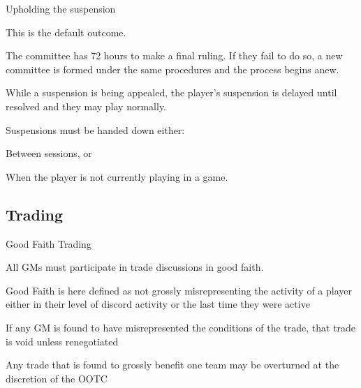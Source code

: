 \begin{deepEnumerate}
\begin{deepEnumerate}
\begin{deepEnumerate}
\begin{deepEnumerate}
			\end{deepEnumerate}
			\item Upholding the suspension
			\begin{deepEnumerate}
				\item This is the default outcome.
			\end{deepEnumerate}
		\end{deepEnumerate}
		\item The committee has 72 hours to make a final ruling.
		If they fail to do so,
		a new committee is formed under the same procedures and the process begins anew.
		\item While a suspension is being appealed,
		the player's suspension is delayed until resolved
		and they may play normally.
	\end{deepEnumerate}
	\item Suspensions must be handed down either:
	\begin{deepEnumerate}
		\item Between sessions, or
		\item When the player is not currently playing in a game.
	\end{deepEnumerate}
\end{deepEnumerate}

\subsection{Trading}
\begin{deepEnumerate}
	\item Good Faith Trading
	\begin{deepEnumerate}
		\item All GMs must participate in trade discussions in good faith.
			\begin{deepEnumerate}
			\item Good Faith is here defined as not grossly misrepresenting the activity of a player either in their level of discord activity or the last time they were active
			\end{deepEnumerate}
		\item If any GM is found to have misrepresented the conditions of the trade, that trade is void unless renegotiated
		\item Any trade that is found to grossly benefit one team may be overturned at the discretion of the OOTC 
	\end{deepEnumerate}
\end{deepEnumerate}

